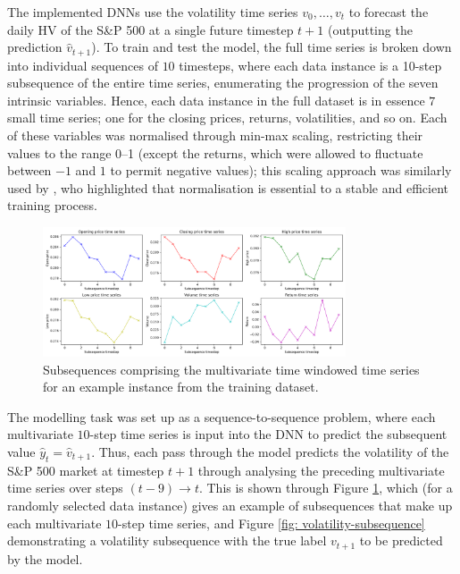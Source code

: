 \documentclass[a4paper, 11pt]{report}
\begin{document}


    The implemented DNNs use the volatility time series $v_0, \ldots, v_t$ to forecast the daily HV of the S\&P 500 at a single future timestep $t+1$ (outputting the prediction $\hat{v}_{t+1}$). To train and test the model, the full time series is broken down into individual sequences of $10$ timesteps, where each data instance is a 10-step subsequence of the entire time series, enumerating the progression of the seven intrinsic variables. Hence, each data instance in the full dataset is in essence $7$ small time series; one for the closing prices, returns, volatilities, and so on. Each of these variables was normalised through min-max scaling, restricting their values to the range 0--1 (except the returns, which were allowed to fluctuate between $-1$ and $1$ to permit negative values); this scaling approach was similarly used by \citet{rodikov-2022}, who highlighted that normalisation is essential to a stable and efficient training process.



    \begin{figure}[ht]
        \centering
        \includegraphics[width=0.8\textwidth]{subsequences.png}
        \caption{\centering Subsequences comprising the multivariate time windowed time series for an example instance from the training dataset.}
        \label{fig: subsequences}
    \end{figure}


    The modelling task was set up as a sequence-to-sequence problem, where each multivariate $10$-step time series is input into the DNN to predict the subsequent value $\hat{y}_t = \hat{v}_{t+1}$. Thus, each pass through the model predicts the volatility of the S\&P 500 market at timestep $t+1$ through analysing the preceding multivariate time series over steps $(t-9) \to t$. This is shown through Figure \ref{fig: subsequences}, which (for a randomly selected data instance) gives an example of subsequences that make up each multivariate $10$-step time series, and Figure \ref{fig: volatility-subsequence} demonstrating a volatility subsequence with the true label $v_{t+1}$ to be predicted by the model.
\end{document}
